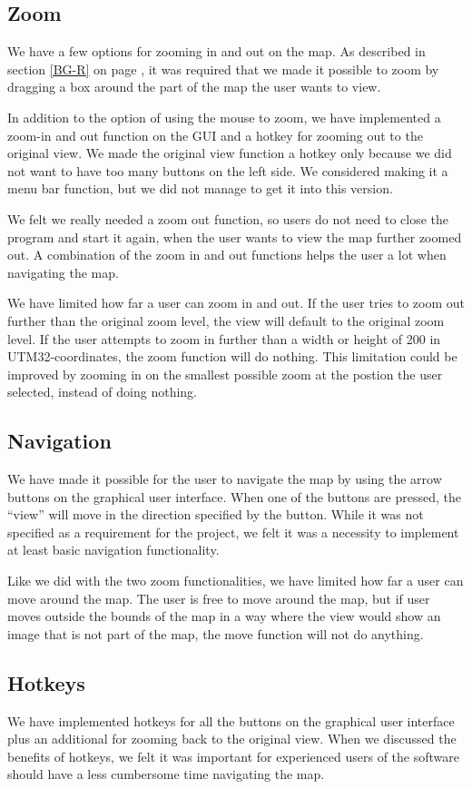 \subsection{Zoom}
\label{UIA-IF-Z}
We have a few options for zooming in and out on the map. As described in
section \ref{BG-R}  on page \pageref{BG-R}, it
was required that we made it possible to zoom by dragging a box around the part of the map the user wants to
view.

In addition to the option of using the mouse to zoom, we have implemented a
zoom-in and out function on the GUI and a hotkey for zooming out to the original
view. We made the original view function a hotkey only because we did not want
to have too many buttons on the left side. We considered making it a menu bar
function, but we did not manage to get it into this version.

We felt we really needed a zoom out function, so users do not need to close the
program and start it again, when the user wants to view the map further zoomed
out. A combination of the zoom in and out functions helps the user a lot when
navigating the map.

We have limited how far a user can zoom in and out. If the user tries to zoom
out further than the original zoom level, the view will default to the original
zoom level. If the user attempts to zoom in further than a width or height of
200 in UTM32-coordinates, the zoom function will do nothing. This limitation
could be improved by zooming in on the smallest possible zoom at the postion the
user selected, instead of doing nothing.
\subsection{Navigation}
\label{UIA-IF-N}
We have made it possible for the user to navigate the map by using the arrow
buttons on the graphical user interface. When one of the buttons are pressed,
the ``view'' will move in the direction specified by the button. While it was
not specified as a requirement for the project, we felt it was a necessity to
implement at least basic navigation functionality.

Like we did with the two zoom functionalities, we have limited how far a user
can move around the map. The user is free to move around the map, but if user
moves outside the bounds of the map in a way where the view would show an image
that is not part of the map, the move function will not do anything.
\subsection{Hotkeys}
\label{UIA-IF-H}
We have implemented hotkeys for all the buttons on the graphical user interface
plus an additional for zooming back to the original view. When we discussed the
benefits of hotkeys, we felt it was important for experienced users of the
software should have a less cumbersome time navigating the map. 

